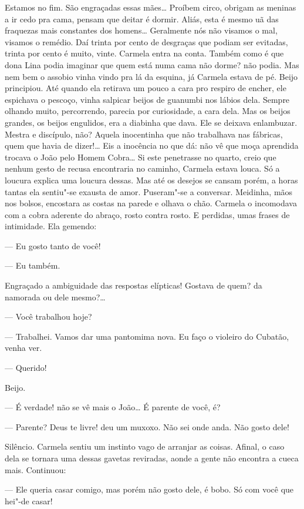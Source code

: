 \begin{linenumbers}
Estamos no fim. São engraçadas essas mães\ldots{} Proíbem circo, obrigam as
meninas a ir cedo pra cama, pensam que deitar é dormir. Aliás, esta é
mesmo uã das fraquezas mais constantes dos homens\ldots{} Geralmente nós não
visamos o mal, visamos o remédio. Daí trinta por cento de desgraças que
podiam ser evitadas, trinta por cento é muito, vinte. Carmela entra na
conta. Também como é que dona Lina podia imaginar que quem está numa
cama não dorme? não podia. Mas nem bem o assobio vinha vindo pra lá da
esquina, já Carmela estava de pé. Beijo principiou. Até quando ela
retirava um pouco a cara pro respiro de encher, ele espichava o pescoço,
vinha salpicar beijos de guanumbi nos lábios dela. Sempre olhando muito,
percorrendo, parecia por curiosidade, a cara dela. Mas os beijos
grandes, os beijos engulidos, era a diabinha que dava. Ele se deixava
enlambuzar. Mestra e discípulo, não? Aquela inocentinha que não
trabalhava nas fábricas, quem que havia de dizer!\ldots{} Eis a inocência no
que dá: não vê que moça aprendida trocava o João pelo Homem Cobra\ldots{} Si
este penetrasse no quarto, creio que nenhum gesto de recusa encontraria
no caminho, Carmela estava louca. Só a loucura explica uma loucura
dessas. Mas até os desejos se cansam porém, a horas tantas ela sentiu"-se
exausta de amor. Puseram"-se a conversar. Meidinha, mãos nos bolsos,
encostara as costas na parede e olhava o chão. Carmela o incomodava com
a cobra aderente do abraço, rosto contra rosto. E perdidas, umas frases
de intimidade. Ela gemendo:

--- Eu gosto tanto de você!

--- Eu também.

Engraçado a ambiguidade das respostas elípticas! Gostava de quem? da
namorada ou dele mesmo?\ldots{}

--- Você trabalhou hoje?

--- Trabalhei. Vamos dar uma pantomima nova. Eu faço o violeiro do
Cubatão, venha ver.

--- Querido!

Beijo.

--- É verdade! não se vê mais o João\ldots{} É parente de você, é?

--- Parente? Deus te livre! deu um muxoxo. Não sei onde anda. Não gosto
dele!

Silêncio. Carmela sentiu um instinto vago de arranjar as coisas. Afinal,
o caso dela se tornara uma dessas gavetas reviradas, aonde a gente não
encontra a cueca mais. Continuou:

--- Ele queria casar comigo, mas porém não gosto dele, é bobo. Só com
você que hei"-de casar!


\end{linenumbers}
